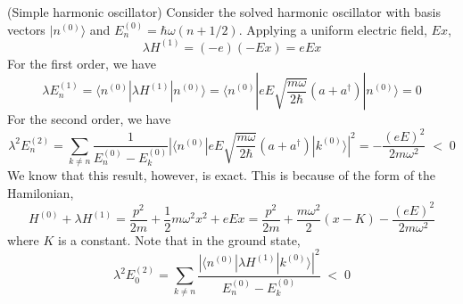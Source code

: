 \begin{ex}
(Simple harmonic oscillator) Consider the solved harmonic oscillator with basis vectors $|n^{(0)}\rangle $ and $E^{(0)}_{n}=\hbar \omega (n+1/2)$. Applying a uniform electric field, $Ex$,
\[\lambda H^{(1)}=(-e)(-Ex)=eEx\]
For the first order, we have
\[\lambda E_{n}^{(1)}=\langle n^{(0)}|\lambda H^{(1)}|n^{(0)}\rangle =\langle n^{(0)}|eE\sqrt{\dfrac{m\omega }{2\hbar }}(a+a^{\dagger })|n^{(0)}\rangle =0\]
For the second order, we have
\[\lambda ^2E_{n}^{(2)}=\sum _{k\ne n}\dfrac{1}{E_{n}^{(0)}-E_{k}^{(0)}}{|\langle n^{(0)}|eE\sqrt{\dfrac{m\omega }{2\hbar }}(a+a^{\dagger })|k^{(0)}\rangle |^2}=-\dfrac{(eE)^2}{2m\omega ^2}\;<\;0\]
We know that this result, however, is exact. This is because of the form of the Hamilonian,
\[H^{(0)}+\lambda H^{(1)}=\dfrac{p^2}{2m}+\dfrac{1}{2}m\omega ^2x^2+eEx=\dfrac{p^2}{2m}+\dfrac{m\omega ^2}{2}(x-K)-\dfrac{(eE)^2}{2m\omega ^2}\]
where $K$ is a constant. Note that in the ground state,
\[\lambda^2 E_{0}^{(2)}=\sum _{k\ne n}\dfrac{|\langle n^{(0)}|\lambda H^{(1)}|k^{(0)}\rangle |^2}{E^{(0)}_{n}-E^{(0)}_{k}}\;<\;0\]

\end{ex}
\vspace{2ex}

